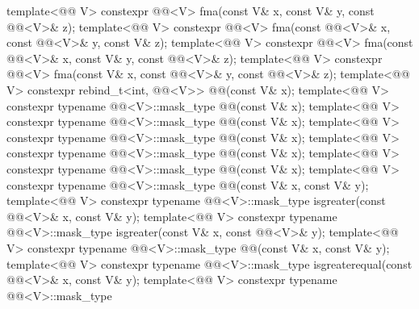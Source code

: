 \begin{itemdecl}
template<@@ V>
  constexpr @@<V> fma(const V& x, const V& y, const @@<V>& z);
template<@@ V>
  constexpr @@<V>
    fma(const @@<V>& x, const @@<V>& y, const V& z);
template<@@ V>
  constexpr @@<V>
    fma(const @@<V>& x, const V& y, const @@<V>& z);
template<@@ V>
  constexpr @@<V>
    fma(const V& x, const @@<V>& y, const @@<V>& z);
template<@@ V>
  constexpr rebind_t<int, @@<V>> @@(const V& x);
template<@@ V>
  constexpr typename @@<V>::mask_type @@(const V& x);
template<@@ V>
  constexpr typename @@<V>::mask_type @@(const V& x);
template<@@ V>
  constexpr typename @@<V>::mask_type @@(const V& x);
template<@@ V>
  constexpr typename @@<V>::mask_type @@(const V& x);
template<@@ V>
  constexpr typename @@<V>::mask_type @@(const V& x);
template<@@ V>
  constexpr typename @@<V>::mask_type @@(const V& x, const V& y);
template<@@ V>
  constexpr typename @@<V>::mask_type isgreater(const @@<V>& x, const V& y);
template<@@ V>
  constexpr typename @@<V>::mask_type isgreater(const V& x, const @@<V>& y);
template<@@ V>
  constexpr typename @@<V>::mask_type
    @@(const V& x, const V& y);
template<@@ V>
  constexpr typename @@<V>::mask_type
    isgreaterequal(const @@<V>& x, const V& y);
template<@@ V>
  constexpr typename @@<V>::mask_type

\end{itemdecl}
